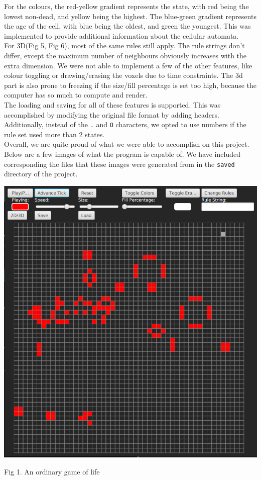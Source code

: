 \documentclass[11pt]{article}
\begin{document}
For the colours, the red-yellow gradient represents the state, with red being
the lowest non-dead, and yellow being the highest.  The blue-green gradient
represents the age of the cell, with blue being the oldest, and green the
youngest.  This was implemented to provide additional information about the
cellular automata.\\

For 3D(Fig 5, Fig 6), most of the same rules still apply.  The rule strings don't differ,
except the maximum number of neighbours obviously increases with the extra
dimension.  We were not able to implement a few of the other features, like
colour toggling or drawing/erasing the voxels due to time constraints.  The 3d
part is also prone to freezing if the size/fill percentage is set too high,
because the computer has so much to compute and render.\\

The loading and saving for all of these features is supported.  This was
accomplished by modifying the original file format by adding headers.
Additionally, instead of the \texttt{.} and \texttt{O} characters, we opted to use numbers if the
rule set used more than 2 states.\\

Overall, we are quite proud of what we were able to accomplish on this project.
Below are a few images of what the program is capable of.  We have included
corresponding the files that these images were generated from in the \texttt{saved}
directory of the project.\\

\begin{center}
\includegraphics[width=.9\linewidth]{./Fig1.png}
\end{center}
Fig 1.  An ordinary game of life
\end{document}
